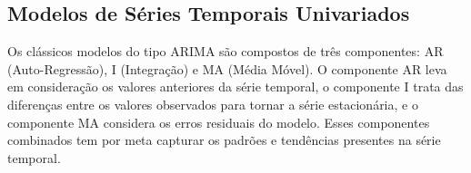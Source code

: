 \subsection{Modelos de S\'eries Temporais Univariados}\label{subsec:arima}

%

Os clássicos modelos do tipo ARIMA são compostos de três componentes: AR (Auto-Regressão), I (Integração) e MA (Média Móvel). O componente AR leva em consideração os valores anteriores da série temporal, o componente I trata das diferenças entre os valores observados para tornar a série estacionária, e o componente MA considera os erros residuais do modelo. Esses componentes combinados  tem por meta capturar os padrões e tendências presentes na série temporal.

